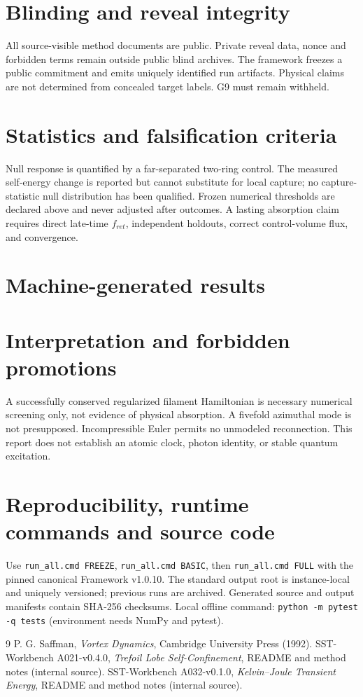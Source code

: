 \documentclass[11pt,a4paper]{article}
\begin{document}
\section{Blinding and reveal integrity}
All source-visible method documents are public. Private reveal data, nonce and forbidden terms remain outside public blind archives. The framework freezes a public commitment and emits uniquely identified run artifacts. Physical claims are not determined from concealed target labels. G9 must remain withheld.
\section{Statistics and falsification criteria}
Null response is quantified by a far-separated two-ring control. The measured self-energy change is reported but cannot substitute for local capture; no capture-statistic null distribution has been qualified. Frozen numerical thresholds are declared above and never adjusted after outcomes. A lasting absorption claim requires direct late-time $f_{ret}$, independent holdouts, correct control-volume flux, and convergence.
\section{Machine-generated results}
\section{Interpretation and forbidden promotions}
A successfully conserved regularized filament Hamiltonian is necessary numerical screening only, not evidence of physical absorption. A fivefold azimuthal mode is not presupposed. Incompressible Euler permits no unmodeled reconnection. This report does not establish an atomic clock, photon identity, or stable quantum excitation.
\section{Reproducibility, runtime commands and source code}
Use \texttt{run\_all.cmd FREEZE}, \texttt{run\_all.cmd BASIC}, then \texttt{run\_all.cmd FULL} with the pinned canonical Framework v1.0.10. The standard output root is instance-local and uniquely versioned; previous runs are archived. Generated source and output manifests contain SHA-256 checksums. Local offline command: \texttt{python -m pytest -q tests} (environment needs NumPy and pytest).
\begin{thebibliography}{9}
 P. G. Saffman, \emph{Vortex Dynamics}, Cambridge University Press (1992).
 SST-Workbench A021-v0.4.0, \emph{Trefoil Lobe Self-Confinement}, README and method notes (internal source).
 SST-Workbench A032-v0.1.0, \emph{Kelvin--Joule Transient Energy}, README and method notes (internal source).
\end{thebibliography}
\end{document}

